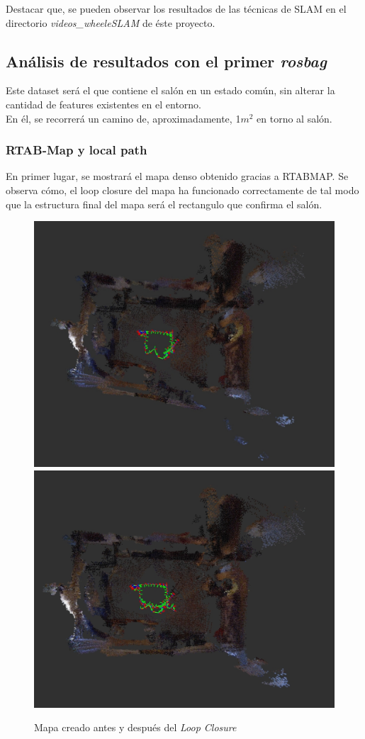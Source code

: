 Destacar que, se pueden observar los resultados de las técnicas de SLAM en el directorio \textit{videos\_wheeleSLAM} de éste proyecto.
\newpage

\subsection{Análisis de resultados con el primer \textit{rosbag}}
Este dataset será el que contiene el salón en un estado común, sin alterar la cantidad de features existentes en el entorno. \\
En él, se recorrerá un camino de, aproximadamente, 1$m^2$ en torno al salón.

\subsubsection{RTAB-Map y local path}
En primer lugar, se mostrará el mapa denso obtenido gracias a RTABMAP. Se observa cómo, el loop closure del mapa ha funcionado correctamente de tal modo que la estructura final
del mapa será el rectangulo que confirma el salón.
\begin{figure}[h!]
    \centering
    \includegraphics[width=.4\textwidth]{images/slam/bag1_rtabmap_noLC}
    \includegraphics[width=.415\textwidth]{images/slam/bag1_rtabmap_LC}
    \caption{Mapa creado antes y después del \textit{Loop Closure}}
\end{figure}

